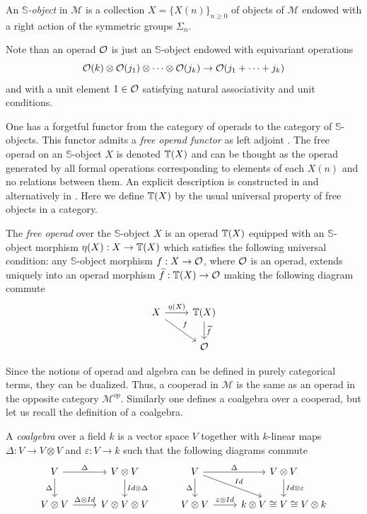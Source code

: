\documentclass[TFM.tex]{subfiles}
\begin{document}
\begin{defi}
 An \emph{$\mathbb{S}$-object} in $\mathscr{M}$ is a collection $X=\{X(n)\}_{n\geq 0}$ of objects of $\mathscr{M}$ endowed with a right action of the symmetric groups $\Sigma_n$.
\end{defi}

Note than an operad ${\mathcal O}$ is just an $\mathbb{S}$-object endowed with
equivariant operations
\[{\mathcal O}(k)\otimes{\mathcal O}(j_1)\otimes\cdots\otimes{\mathcal O}(j_k)\to {\mathcal O}(j_1+\cdots+j_k)\]
and with a unit element $1 \in{\mathcal O}$ satisfying natural associativity and unit conditions.




One has a forgetful functor from the category of operads to the category of $\mathbb{S}$-objects. This functor admits a \emph{free operad functor} as left adjoint \cite{GJHinich}. The free operad on an $\mathbb{S}$-object $X$ is denoted $\mathbb{T}(X)$ and can be thought as the operad generated by all formal operations corresponding to elements of each $X(n)$ and no relations between them. An explicit description is constructed in \cite{GJHinich} and alternatively in \cite{AlgebraicOperads}. Here we define $\mathbb{T}(X)$ by the usual universal property of free objects in a category. 

\begin{defi}
The \emph{free operad} over the $\mathbb{S}$-object $X$ is an operad $\mathbb{T}(X)$ equipped with an $\mathbb{S}$-object morphism $\eta(X):X\to\mathbb{T}(X)$ which satisfies the following universal condition: any $\mathbb{S}$-object morphism $f:X\to {\mathcal O}$, where ${\mathcal O}$ is an operad, extends uniquely into an operad morphism $\widetilde{f}:\mathbb{T}(X)\to{\mathcal O}$ making the following diagram commute
\[
\begin{tikzcd}
X\arrow[r, "\eta(X)"]\arrow[dr,"f"] & \T(X)\arrow[d, "\widetilde{f}"]\\
& \OO
\end{tikzcd}
\] 
\end{defi}

Since the notions of operad and algebra can be defined in purely categorical terms, they can be dualized. Thus, a cooperad in $\mathscr{M}$ is
the same as an operad in the opposite category $\mathscr{M}^{op}$. Similarly one defines a coalgebra over a cooperad, but let us recall the definition of a coalgebra.

\begin{defi}\label{coalgebra}
A \emph{coalgebra} over a field $k$ is a vector space $V$ together with $k$-linear maps $\Delta:V\to V\otimes V$ and $\varepsilon:V\to k$ such that the following diagrams commute
\[
\begin{tikzcd}
V \arrow[r, "\Delta"] \arrow[d, "\Delta"'] & V\otimes V \arrow[d, "Id\otimes\Delta"] & V \arrow[r, "\Delta"] \arrow[d, "\Delta"'] \arrow[rd, "Id"] & V\otimes V \arrow[d, "Id\otimes\varepsilon"] \\
V\otimes V \arrow[r, "\Delta\otimes Id"]   & V\otimes V\otimes V                     & V\otimes V \arrow[r, "\varepsilon\otimes Id"]               & k\otimes V\cong V\cong V\otimes k           
\end{tikzcd}
\]
\end{defi}
\end{document}
